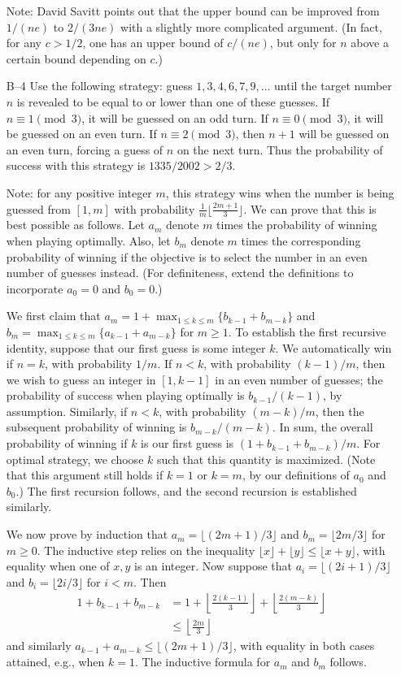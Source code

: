 \documentclass[amssymb,twocolumn,pra,10pt,aps]{revtex4-1}
\begin{document}
\begin{itemize}
Note: David Savitt points out that the upper bound can be improved from
$1/(ne)$ to $2/(3ne)$ with a slightly more complicated argument. (In
fact, for any $c>1/2$, one has an upper bound of $c/(ne)$, but only
for $n$ above a certain bound depending on $c$.)

\item[B--4]
Use the following strategy: guess $1, 3, 4, 6, 7, 9, \dots$
until the target number $n$ is revealed to be equal to or lower than one
of these guesses. If $n \equiv 1 \pmod{3}$, it will be guessed on an
odd turn. If $n \equiv 0 \pmod{3}$, it will be guessed on an even turn.
If $n \equiv 2 \pmod{3}$, then $n+1$ will be guessed on an even turn,
forcing a guess of $n$ on the next turn. Thus the probability
of success with this strategy is $1335/2002 > 2/3$.

Note: for any positive integer $m$, this strategy wins when the
number is being guessed from $[1,m]$ with probability
$\frac{1}{m} \lfloor \frac{2m+1}{3} \rfloor$. We can prove that
this is best possible as follows.
Let $a_m$ denote $m$ times
the probability of winning when playing optimally.  Also, let $b_m$
denote $m$ times the corresponding probability of winning if the
objective is to select the number in an even number of guesses
instead.  (For definiteness, extend the definitions to incorporate
$a_0 = 0$ and $b_0=0$.)

We first claim that $a_m = 1 + \max_{1\leq k\leq m} \{b_{k-1} +
b_{m-k}\}$ and $b_m = \max_{1\leq k\leq m} \{a_{k-1} + a_{m-k}\}$ for $m
\geq 1$.  To establish the first recursive identity, suppose that our
first guess is some integer $k$. We automatically win if $n=k$, with
probability $1/m$. If $n<k$, with probability $(k-1)/m$, then we wish
to guess an integer in $[1,k-1]$ in an even number of guesses; the
probability of success when playing optimally is $b_{k-1}/(k-1)$, by
assumption.  Similarly, if $n<k$, with probability $(m-k)/m$, then the
subsequent probability of winning is $b_{m-k}/(m-k)$.  In sum, the
overall probability of winning if $k$ is our first guess is
$(1+b_{k-1}+b_{m-k})/m$. For optimal strategy, we choose $k$ such that
this quantity is maximized. (Note that this argument still holds if
$k=1$ or $k=m$, by our definitions of $a_0$ and $b_0$.)  The first
recursion follows, and the second recursion is established similarly.

We now prove by induction that $a_m = \lfloor (2m+1)/3 \rfloor$ and
$b_m = \lfloor 2m/3 \rfloor$ for $m \geq 0$. The inductive step relies
on the inequality $\lfloor x \rfloor + \lfloor y \rfloor \leq \lfloor
x+y \rfloor$, with equality when one of $x,y$ is an integer. Now
suppose that $a_i = \lfloor (2i+1)/3 \rfloor$ and
$b_i = \lfloor 2i/3 \rfloor$ for $i < m$. Then
\begin{align*}
1+b_{k-1}+b_{m-k} &= 1+\left\lfloor \frac{2(k-1)}{3} \right\rfloor +
\left\lfloor
\frac{2(m-k)}{3} \right\rfloor \\
&\leq \left\lfloor \frac{2m}{3} \right\rfloor
\end{align*}
and similarly $a_{k-1}+a_{m-k} \leq \lfloor (2m+1)/3 \rfloor$, with
equality in both cases attained, e.g., when $k=1$.
The inductive formula for $a_m$ and $b_m$ follows.


\end{itemize}
\end{document}
